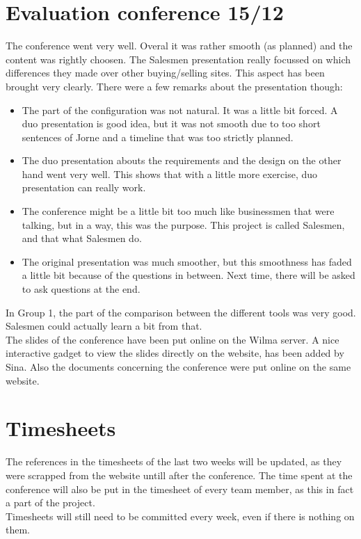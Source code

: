 \documentclass[a4paper, 12pt]{article}
\begin{document}
	\section{Evaluation conference 15/12}
	The conference went very well. Overal it was rather smooth (as planned) and the content was rightly choosen. 	The Salesmen presentation really focussed on which differences they made over other buying/selling sites. This aspect has been brought very clearly. There were a few remarks about the presentation though:
		\begin{itemize}
			\item The part of the configuration was not natural. It was a little bit forced. A duo presentation is good idea, but it was not smooth due to too short sentences of Jorne and a timeline that was too strictly planned.
			\item The duo presentation abouts the requirements and the design on the other hand went very well. This shows that with a little more exercise, duo presentation can really work.
			\item The conference might be a little bit too much like businessmen that were talking, but in a way, this was the purpose. This project is called Salesmen, and that what Salesmen do.
			\item The original presentation was much smoother, but this smoothness has faded a little bit because of the questions in between. Next time, there will be asked to ask questions at the end.
		\end{itemize}
		
In Group 1, the part of the comparison between the different tools was very good. Salesmen could actually learn a bit from that.\\
The slides of the conference have been put online on the Wilma server. \cite{site1} A nice interactive gadget to view the slides directly on the website, has been added by Sina. Also the documents concerning the conference were put online on the same website.

	\section{Timesheets}
The references in the timesheets of the last two weeks will be updated, as they were scrapped from the website untill after the conference. The time spent at the conference will also be put in the timesheet of every team member, as this in fact a part of the project. \\
Timesheets will still need to be committed every week, even if there is nothing on them.
\end{document}
